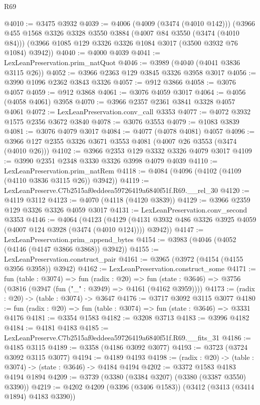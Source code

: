 \begin{lexlean}{R69}
\begin{coremodule}
@4010 := @3475 @3932
@4039 := @4006
    (@4009 (@3474 (@4010 @142)))
    (@3966
      @455
      @1568
      @3326
      @3328
      @3550
      @3884
      (@4007 @84 @3550 (@3474 (@4010 @84)))
      (@3966 @1085 @129 @3326 @3326 @1084 @3017 (@3500 @3932 @76 @1084) @3942))
@4040 := @4000 @4039
@4041 := LexLeanPreservation.prim_natQuot
@4046 := @3989 (@4040 (@4041 @3836 @3115 @26))
@4052 := @3966 @2363 @129 @3845 @3326 @3958 @3017
@4056 := @3990 @1096 @2362 @3843 @3326
@4057 := @912 @3866
@4058 := @3076 @4057
@4059 := @912 @3868
@4061 := @3076 @4059 @3017
@4064 := @4056 (@4058 @4061) @3958
@4070 := @3966 @2357 @2361 @3841 @3328 @4057 @4061
@4072 := LexLeanPreservation.conv_call @3353
@4077 := @4072 @3932 @1575 @2356 @3672 @3840
@4078 := @3076 @3553
@4079 := @1083 @3839
@4081 := @3076 @4079 @3017
@4084 := @4077 (@4078 @4081) @4057
@4096 := @3966 @127 @2355 @3326 @3671 @3553 @4081 (@4007 @26 @3553 (@3474 (@4010 @26)))
@4102 := @3966 @2353 @129 @3332 @3326 @4079 @3017
@4109 := @3990 @2351 @2348 @3330 @3326 @3998 @4079 @4039
@4110 := LexLeanPreservation.prim_natRem
@4118 := @4084 (@4096 (@4102 (@4109 (@4110 @3836 @3115 @26)) @3942))
@4119 := LexLeanPreserve.C7b2515af0eddeea59726419a6840f51f.R69.__rel_30
@4120 := @4119 @3112
@4123 := @4070 (@4118 (@4120 @3839))
@4129 := @3966 @2359 @129 @3326 @3326 @4059 @3017
@4131 := LexLeanPreservation.conv_second @3353
@4146 := @4064
    (@4123
      (@4129 (@4131 @3932 @486 @3326 @3925 @4059 (@4007 @124 @3928 (@3474 (@4010 @124)))) @3942))
@4147 := LexLeanPreservation.prim_append_bytes
@4154 := @3983 (@4046 (@4052 (@4146 (@4147 @3866 @3868)) @3942))
@4155 := LexLeanPreservation.construct_pair
@4161 := @3965 (@3972 (@4154 (@4155 @3956 @3958)) @3942)
@4162 := LexLeanPreservation.construct_some
@4171 := fun (table : @3074) =>
  fun (radix : @20) =>
  fun (state : @3646) => @3756 (@3816 (@3947 (fun ("_" : @3949) => @4161 (@4162 @3959))))
@4173 := (radix : @20) -> (table : @3074) -> @3647
@4176 := @3717 @3092 @3115 @3077
@4180 := fun (radix : @20) => fun (table : @3074) => fun (state : @3646) => @3331 @4176
@4181 := @3354 @1583
@4182 := @3208 @3713
@4183 := @3996 @4182
@4184 := @4181 @4183
@4185 := LexLeanPreserve.C7b2515af0eddeea59726419a6840f51f.R69.__fits_31
@4186 := @4185 @3115
@4189 := @3358 (@4186 @3092 @3077)
@4193 := @3723 (@3724 @3092 @3115 @3077)
@4194 := @4189 @4193
@4198 := (radix : @20) -> (table : @3074) -> (state : @3646) -> @4184 @4194
@4202 := @3372 @1583 @4183 @4194 @1894
@4209 := @3739 (@3380 (@3384 @3207) (@3380 (@3387 @3550) @3390))
@4219 := @4202 @4209 (@3396 (@3406 @1583)) (@3412 (@3413 (@3414 @1894) @4183 @3390))

\end{coremodule}
\end{lexlean}
